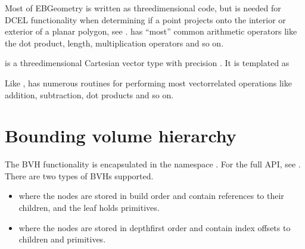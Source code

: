 \documentclass[letterpaper,10pt,english]{sphinxmanual}
\begin{document}
\sphinxAtStartPar
Most of EBGeometry is written as three\sphinxhyphen{}dimensional code, but  is needed for DCEL functionality when determining if a point projects onto the interior or exterior of a planar polygon, see {\hyperref[\detokenize{DCEL:chap-dcel}]{}}.
 has “most” common arithmetic operators like the dot product, length, multiplication operators and so on.

\sphinxAtStartPar
{} is a three\sphinxhyphen{}dimensional Cartesian vector type with precision .
It is templated as

\begin{sphinxVerbatim}[commandchars=\\\{\}]
\PYG{p}{[}\PYG{p}{]}
\end{sphinxVerbatim}

\sphinxAtStartPar
Like ,  has numerous routines for performing most vector\sphinxhyphen{}related operations like addition, subtraction, dot products and so on.

\sphinxstepscope


\section{Bounding volume hierarchy}
\label{\detokenize{ImplemBVH:bounding-volume-hierarchy}}\label{\detokenize{ImplemBVH:chap-implembvh}}\label{\detokenize{ImplemBVH::doc}}
\sphinxAtStartPar
The BVH functionality is encapsulated in the namespace .
For the full API, see .
There are two types of BVHs supported.
\begin{itemize}
\item {} 
\sphinxAtStartPar
{} where the nodes are stored in build order and contain references to their children, and the leaf holds primitives.

\item {} 
\sphinxAtStartPar
{} where the nodes are stored in depth\sphinxhyphen{}first order and contain index offsets to children and primitives.

\end{itemize}
\end{document}
